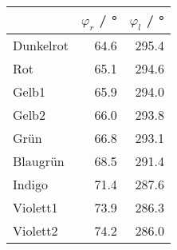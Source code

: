 \begin{tabular}{lrr}
	\toprule
	{}        & $\varphi_r$ / \si{\degree} & $\varphi_l$ / \si{\degree} \\
	\midrule
	Dunkelrot & 64.6                       & 295.4                      \\
	Rot       & 65.1                       & 294.6                      \\
	Gelb1     & 65.9                       & 294.0                      \\
	Gelb2     & 66.0                       & 293.8                      \\
	Grün      & 66.8                       & 293.1                      \\
	Blaugrün  & 68.5                       & 291.4                      \\
	Indigo    & 71.4                       & 287.6                      \\
	Violett1  & 73.9                       & 286.3                      \\
	Violett2  & 74.2                       & 286.0                      \\
	\bottomrule
\end{tabular}
